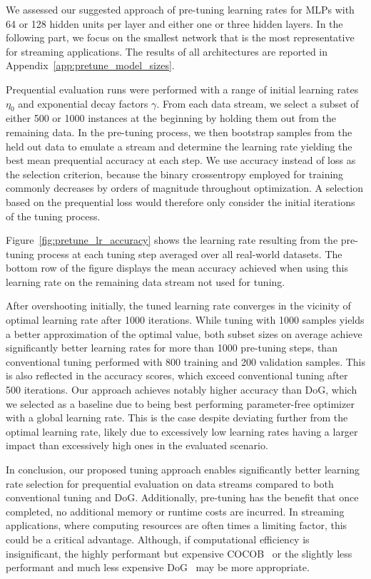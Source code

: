 \documentclass[runningheads]{llncs}
\begin{document}
We assessed our suggested approach of pre-tuning learning rates for MLPs with 64 or 128 hidden units per layer and either one or three hidden layers.
In the following part, we focus on the smallest network that is the most representative for streaming applications.
The results of all architectures are reported in Appendix~\ref{app:pretune_model_sizes}.

Prequential evaluation runs were performed with a range of initial learning rates $\eta_0$ and exponential decay factors $\gamma$.
From each data stream, we select a subset of either 500 or 1000 instances at the beginning by holding them out from the remaining data.
In the pre-tuning process, we then bootstrap samples from the held out data to emulate a stream and determine the learning rate yielding the best mean prequential accuracy at each step.
We use accuracy instead of loss as the selection criterion, because the binary crossentropy employed for training commonly decreases by orders of magnitude throughout optimization.
A selection based on the prequential loss would therefore only consider the initial iterations of the tuning process.

Figure~\ref{fig:pretune_lr_accuracy} shows the learning rate resulting from the pre-tuning process at each tuning step averaged over all real-world datasets.
The bottom row of the figure displays the mean accuracy achieved when using this learning rate on the remaining data stream not used for tuning.

After overshooting initially, the tuned learning rate converges in the vicinity of optimal learning rate after 1000 iterations.
While tuning with 1000 samples yields a better approximation of the optimal value, both subset sizes on average achieve significantly better learning rates for more than 1000 pre-tuning steps, than conventional tuning performed with 800 training and 200 validation samples.
This is also reflected in the accuracy scores, which exceed conventional tuning after 500 iterations.
Our approach achieves notably higher accuracy than DoG, which we selected as a baseline due to being best performing parameter-free optimizer with a global learning rate.
This is the case despite deviating further from the optimal learning rate, likely due to excessively low learning rates having a larger impact than excessively high ones in the evaluated scenario.

In conclusion, our proposed tuning approach enables significantly better learning rate selection for prequential evaluation on data streams compared to both conventional tuning and DoG.
Additionally, pre-tuning has the benefit that once completed, no additional memory or runtime costs are incurred.
In streaming applications, where computing resources are often times a limiting factor, this could be a critical advantage.
Although, if computational efficiency is insignificant, the highly performant but expensive COCOB~\cite{orabonaTrainingDeepNetworks2017} or the slightly less performant and much less expensive DoG~\cite{ivgiDoGSGDBest2023} may be more appropriate.
\end{document}

